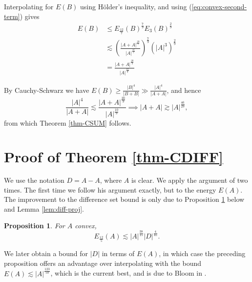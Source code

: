 \documentclass[reqno]{amsart}
\newcommand{\holder}{H\"older}
\numberwithin{equation}{section}
\newtheorem{prop}[theorem]{Proposition}
\begin{document}
Interpolating for \(E(B)\) using \holder's inequality, and using (\ref{eq:convex-second-term}) gives
\begin{align*}
E(B) & \leq  E_{\frac{12}{7} } (B)^{\frac{7}{9} }  E_3(B)  ^{\frac{2}{9} } \\
& \lesssim \left( \frac{\left\lvert A+A \right\rvert ^{\frac{20}{7} }}{\left\lvert A \right\rvert ^{\frac{16}{7} }}  \right) ^{\frac{7}{9} } \left( \left\lvert A \right\rvert ^{3}  \right) ^{\frac{2}{9} }\\
& = \frac{\left\lvert A+A \right\rvert^{\frac{20}{9} } }{\left\lvert A \right\rvert ^{\frac{10}{9} }} 
\end{align*}

By Cauchy-Schwarz we have \(E(B) \geq \frac{\left\lvert B \right\rvert ^{4}}{\left\lvert B+B \right\rvert } \gg \frac{\left\lvert A \right\rvert ^{4}}{\left\lvert A+A \right\rvert }  \), and hence
\[
    \frac{\left\lvert A \right\rvert ^{4}}{\left\lvert A + A \right\rvert } \lesssim \frac{\left\lvert A+A \right\rvert^{\frac{20}{9} } }{\left\lvert A \right\rvert ^{\frac{10}{9} }}  \implies \left\lvert A+A \right\rvert \gtrsim \left\lvert A \right\rvert ^{\frac{46}{29} }
,\]
from which Theorem \ref{thm-CSUM} follows.

\bigskip

\section{Proof of Theorem \ref{thm-CDIFF}}\label{section:CDIFF}
We use the notation \(D  = A-A\), where \(A\) is clear.
We apply the argument of \cite{bloom} two times. The first time we follow his argument exactly, but to the energy \(E(A)\).
The improvement to the difference set bound is only due to Proposition \ref{prop-ea} below and Lemma \ref{lem:diff-proj}.

\begin{prop}\label{prop-ea}
For \(A\) convex,
\[
    E_{\frac{12}{5} } (A) \lesssim \left\lvert A \right\rvert ^{\frac{38}{15} } \left\lvert D  \right\rvert ^{\frac{4}{45} }
.\]
\end{prop}

We later obtain a bound for \(\left\lvert D \right\rvert \) in terms of \(E (A)\), in which case
the preceding proposition offers an advantage over interpolating with the bound \(E(A) \lesssim \left\lvert A \right\rvert ^{\frac{123}{50} }\),
which is the current best, and is due to Bloom in \cite{bloom}.
\end{document}
